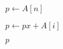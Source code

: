 
\begin{algorithm}[H]
  \begin{algorithmic}[1]
     
      \State $p \gets A[n]$

      \hStatex
	\State $p \gets px + A[i]$
      \EndFor

      \hStatex
      \State \Return $p$
    \EndProcedure
  \end{algorithmic}
\end{algorithm}
